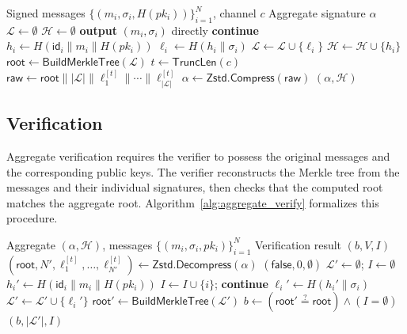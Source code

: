 \documentclass[conference,10pt]{IEEEtran}
\begin{document}
\begin{algorithm}[t]
\caption{$\mathsf{AggregateSign}$: Aggregate $N$ PQC Signatures}
\label{alg:aggregate_sign}
\begin{algorithmic}[1]
\REQUIRE Signed messages $\{(m_i, \sigma_i, H(pk_i))\}_{i=1}^{N}$, channel $c$
\ENSURE Aggregate signature $\alpha$
\STATE $\mathcal{L} \leftarrow \emptyset$ 
\STATE $\mathcal{H} \leftarrow \emptyset$ 
        \STATE \textbf{output} $(m_i, \sigma_i)$ directly 
        \STATE \textbf{continue}
    \ENDIF
    \STATE $h_i \leftarrow H(\mathsf{id}_i \| m_i \| H(pk_i))$
    \STATE $\ell_i \leftarrow H(h_i \| \sigma_i)$
    \STATE $\mathcal{L} \leftarrow \mathcal{L} \cup \{\ell_i\}$
    \STATE $\mathcal{H} \leftarrow \mathcal{H} \cup \{h_i\}$
\ENDFOR
\STATE $\mathsf{root} \leftarrow \mathsf{BuildMerkleTree}(\mathcal{L})$
\STATE $t \leftarrow \mathsf{TruncLen}(c)$ 
\STATE $\mathsf{raw} \leftarrow \mathsf{root} \| |\mathcal{L}| \| \ell_1^{[t]} \| \cdots \| \ell_{|\mathcal{L}|}^{[t]}$
\STATE $\alpha \leftarrow \mathsf{Zstd.Compress}(\mathsf{raw})$
\RETURN $(\alpha, \mathcal{H})$
\end{algorithmic}
\end{algorithm}

\subsection{Verification}

Aggregate verification requires the verifier to possess the original messages and the corresponding public keys. The verifier reconstructs the Merkle tree from the messages and their individual signatures, then checks that the computed root matches the aggregate root. Algorithm~\ref{alg:aggregate_verify} formalizes this procedure.

\begin{algorithm}[t]
\caption{$\mathsf{AggregateVerify}$: Verify Aggregate Signature}
\label{alg:aggregate_verify}
\begin{algorithmic}[1]
\REQUIRE Aggregate $(\alpha, \mathcal{H})$, messages $\{(m_i, \sigma_i, pk_i)\}_{i=1}^{N}$
\ENSURE Verification result $(b, V, I)$
\STATE $(\mathsf{root}, N', \ell_1^{[t]}, \ldots, \ell_{N'}^{[t]}) \leftarrow \mathsf{Zstd.Decompress}(\alpha)$
    \RETURN $(\mathsf{false}, 0, \emptyset)$
\ENDIF
\STATE $\mathcal{L}' \leftarrow \emptyset$; $I \leftarrow \emptyset$ 
    \STATE $h_i' \leftarrow H(\mathsf{id}_i \| m_i \| H(pk_i))$
        \STATE $I \leftarrow I \cup \{i\}$; \textbf{continue}
    \ENDIF
    \STATE $\ell_i' \leftarrow H(h_i' \| \sigma_i)$
    \STATE $\mathcal{L}' \leftarrow \mathcal{L}' \cup \{\ell_i'\}$
\ENDFOR
\STATE $\mathsf{root}' \leftarrow \mathsf{BuildMerkleTree}(\mathcal{L}')$
\STATE $b \leftarrow (\mathsf{root}' \stackrel{?}{=} \mathsf{root}) \wedge (I = \emptyset)$
\RETURN $(b, |\mathcal{L}'|, I)$
\end{algorithmic}
\end{algorithm}
\end{document}
